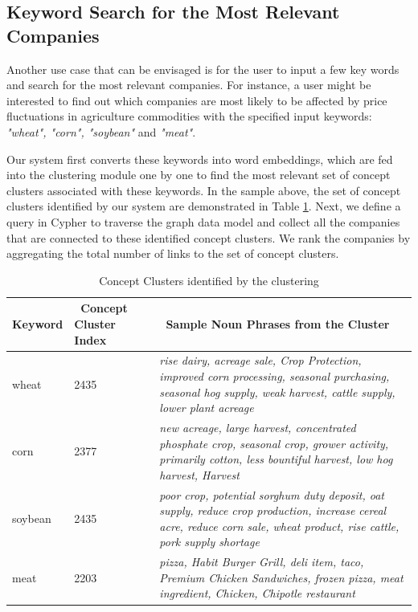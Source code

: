\subsection{Keyword Search for the Most Relevant Companies}
Another use case that can be envisaged is for the user to input a few key words and search for the most relevant companies. For instance, a user might be interested to find out which companies are most likely to be affected by price fluctuations in agriculture commodities with the specified input keywords: \emph{"wheat", "corn", "soybean"} and \emph{"meat"}. 

Our system first converts these keywords into word embeddings, which are fed into the clustering module one by one to find the most relevant set of concept clusters associated with these keywords. In the sample above, the set of concept clusters identified by our system are demonstrated in Table \ref{table:kwsearch}. Next, we define a query in Cypher to traverse the graph data model and collect all the companies that are connected to these identified concept clusters. We rank the companies by aggregating the total number of links to the set of concept clusters. 

\begin{table} 
\small
\centering
\begin{tabular} {| m{5em} | m{4em} |m{26em} |}
\hline
Keyword & \ Concept Cluster Index & \ Sample Noun Phrases from the Cluster\\ 
\hline
wheat & 2435 & \emph{rise dairy, acreage sale, Crop Protection, improved corn processing, seasonal purchasing, seasonal hog supply, weak harvest, cattle supply, lower plant acreage}\\ 
\hline
corn &2377 & \emph{new acreage, large harvest, concentrated phosphate crop, seasonal crop, grower activity, primarily cotton, less bountiful harvest, low hog harvest, Harvest} \\
\hline
soybean & 2435 & \emph{poor crop, potential sorghum duty deposit, oat supply, reduce crop production, increase cereal acre, reduce corn sale, wheat product, rise cattle, pork supply shortage}\\ 
\hline
meat & 2203 &\emph{pizza, Habit Burger Grill, deli item, taco, Premium Chicken Sandwiches, frozen pizza, meat ingredient, Chicken, Chipotle restaurant} \\ 
\hline
\end{tabular}
\caption{Concept Clusters identified by the clustering}
\label{table:kwsearch}
\end{table}


